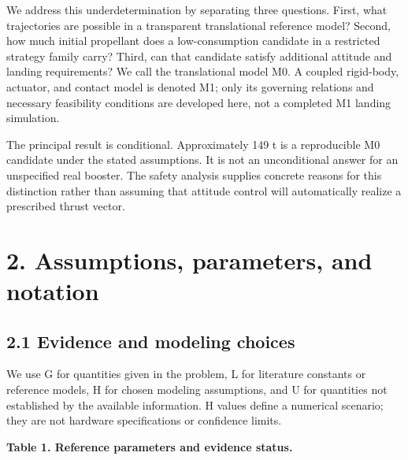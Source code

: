 \documentclass[
  11pt,
  a4paper,
]{article}
\begin{document}
We address this underdetermination by separating three questions. First,
what trajectories are possible in a transparent translational reference
model? Second, how much initial propellant does a low-consumption
candidate in a restricted strategy family carry? Third, can that
candidate satisfy additional attitude and landing requirements? We call
the translational model M0. A coupled rigid-body, actuator, and contact
model is denoted M1; only its governing relations and necessary
feasibility conditions are developed here, not a completed M1 landing
simulation.

The principal result is conditional. Approximately 149 t is a
reproducible M0 candidate under the stated assumptions. It is not an
unconditional answer for an unspecified real booster. The safety
analysis supplies concrete reasons for this distinction rather than
assuming that attitude control will automatically realize a prescribed
thrust vector.

\section{2. Assumptions, parameters, and
notation}\label{assumptions-parameters-and-notation}

\subsection{2.1 Evidence and modeling
choices}\label{evidence-and-modeling-choices}

We use G for quantities given in the problem, L for literature constants
or reference models, H for chosen modeling assumptions, and U for
quantities not established by the available information. H values define
a numerical scenario; they are not hardware specifications or confidence
limits.

\textbf{Table 1. Reference parameters and evidence status.}
\end{document}
